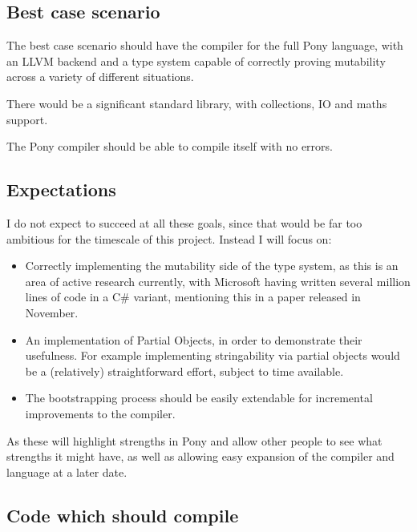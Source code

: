 \documentclass{article}
\begin{document}
\subsection{Best case scenario}

The best case scenario should have the compiler for the full Pony language, with
an LLVM backend and a type system capable of correctly proving mutability across
a variety of different situations.

There would be a significant standard library, with collections, IO and maths
support.

The Pony compiler should be able to compile itself with no errors.

\subsection{Expectations}

I do not expect to succeed at all these goals, since that would be far too
ambitious for the timescale of this project. Instead I will focus on:
\begin{itemize}
\item Correctly implementing the mutability side of
	the type system, as this is an area of active research currently, with
	Microsoft	having written several million lines of code in a C\# variant,
	mentioning this in a paper released in November\cite{microsoft2012}.

\item An implementation of Partial Objects, in order to demonstrate their
	usefulness. For example implementing stringability via partial objects
	would be a (relatively) straightforward effort, subject to time available.

\item The bootstrapping process should be easily extendable for incremental
	 improvements to the compiler.
\end{itemize}

As these will highlight strengths in Pony and allow other people to see what
strengths it might have, as well as allowing easy expansion of the compiler and
language at a later date.

\subsection{Code which should compile}
\end{document}
